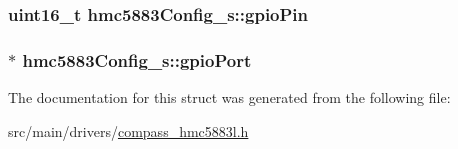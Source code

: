 \hypertarget{structhmc5883Config__s_ab2726b794b1d1f0d2506a270af213c02}{
\subsubsection[{gpio\+Pin}]{\setlength{\rightskip}{0pt plus 5cm}uint16\+\_\+t hmc5883\+Config\+\_\+s\+::gpio\+Pin}}\label{structhmc5883Config__s_ab2726b794b1d1f0d2506a270af213c02}
\hypertarget{structhmc5883Config__s_a9630b820c20ba30ac77ee31227635149}{
\subsubsection[{gpio\+Port}]{$\ast$ hmc5883\+Config\+\_\+s\+::gpio\+Port}}\label{structhmc5883Config__s_a9630b820c20ba30ac77ee31227635149}


The documentation for this struct was generated from the following file\+:\begin{DoxyCompactItemize}
\item 
src/main/drivers/\hyperlink{compass__hmc5883l_8h}{compass\+\_\+hmc5883l.\+h}\end{DoxyCompactItemize}
